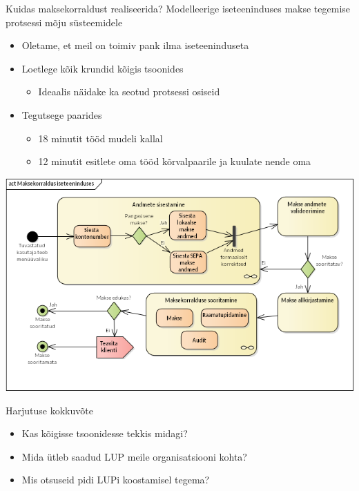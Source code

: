 \documentclass{beamer}
\begin{document}
\begin{frame}{Kuidas maksekorraldust realiseerida?}
Modelleerige iseteeninduses makse tegemise protsessi mõju süsteemidele
\begin{itemize}
	\item Oletame, et meil on toimiv pank ilma iseteeninduseta
	\item Loetlege kõik krundid kõigis tsoonides
	\begin{itemize}
		\item Ideaalis näidake ka seotud protsessi osiseid
	\end{itemize}
	\item Tegutsege paarides
	\begin{itemize}
		\item 18 minutit tööd mudeli kallal
		\item 12 minutit esitlete oma tööd kõrvalpaarile ja kuulate nende oma
	\end{itemize}
\end{itemize}
\end{frame}

\begin{frame}[fragile]

	\begin{center}
	\includegraphics[width=\textwidth]{maksekasiset.png}
	\end{center}
\end{frame}


\begin{frame}{Harjutuse kokkuvõte}
	\begin{itemize}
		\item Kas kõigisse tsoonidesse tekkis midagi? 
		\item Mida ütleb saadud LUP meile organisatsiooni kohta?
		\item Mis otsuseid pidi LUPi koostamisel tegema?
	\end{itemize}
\end{frame}
\end{document}
